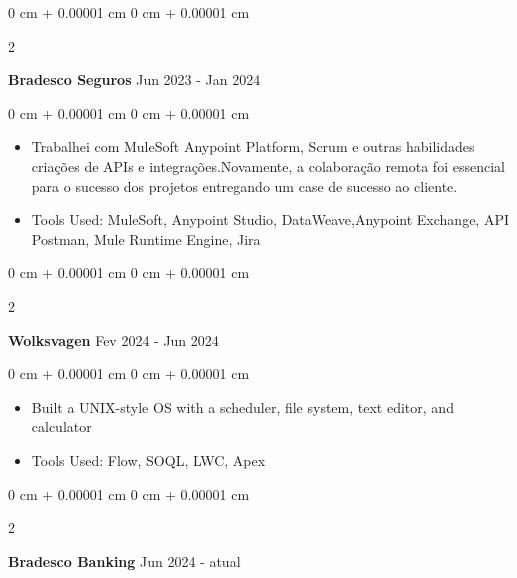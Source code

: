 \documentclass[10pt, letterpaper]{article}
\newenvironment{highlights}{
    \begin{itemize}[
        topsep=0.10 cm,
        parsep=0.10 cm,
        partopsep=0pt,
        itemsep=0pt,
        leftmargin=0 cm + 10pt
    ]
}{
    \end{itemize}
} %
\newenvironment{onecolentry}{
    \begin{adjustwidth}{
        0 cm + 0.00001 cm
    }{
        0 cm + 0.00001 cm
    }
}{
    \end{adjustwidth}
} %
\newenvironment{twocolentry}[2][]{
    \onecolentry
    \def\secondColumn{#2}
    \setcolumnwidth{\fill, 4.5 cm}
    \begin{paracol}{2}
}{
    \switchcolumn \raggedleft \secondColumn
    \end{paracol}
    \endonecolentry
} %
\begin{document}
        \vspace{0.2 cm}

        \begin{twocolentry}{
            Jun 2023 - Jan 2024
        }
        
            \textbf{Bradesco Seguros}\end{twocolentry}

        \vspace{0.10 cm}
        \begin{onecolentry}
            \begin{highlights}
                \item Trabalhei com MuleSoft Anypoint Platform, Scrum e outras habilidades criações de APIs e integrações.Novamente, a colaboração remota foi essencial para o sucesso dos projetos entregando um case de sucesso ao cliente.
                \item Tools Used: MuleSoft, Anypoint Studio, DataWeave,Anypoint Exchange, API  Postman, Mule Runtime Engine, Jira
            \end{highlights}
        \end{onecolentry}


        \vspace{0.2 cm}

        \begin{twocolentry}{
            Fev 2024 - Jun 2024 
        }
        
            \textbf{Wolksvagen}\end{twocolentry}

        \vspace{0.10 cm}
        \begin{onecolentry}
            \begin{highlights}
                \item Built a UNIX-style OS with a scheduler, file system, text editor, and calculator
                \item Tools Used: Flow, SOQL, LWC, Apex
            \end{highlights}
        \end{onecolentry}        


        \vspace{0.2 cm}

        \begin{twocolentry}{
            Jun 2024 - atual
        }
        
            \textbf{Bradesco Banking}\end{twocolentry}
\end{document}
